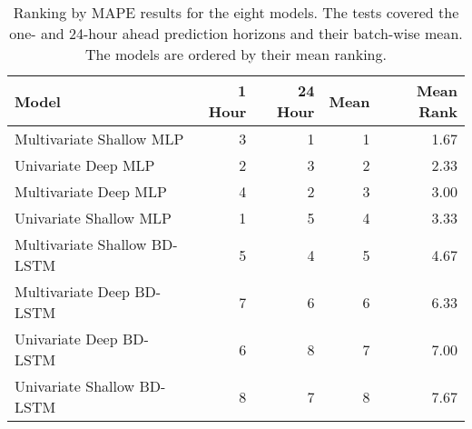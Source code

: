 \begin{table}[H]
\centering
\begin{tabular}{lrrr|r}
\toprule
Model & 1 Hour & 24 Hour & Mean & Mean Rank \\
\midrule
Multivariate Shallow MLP & 3 & 1 & 1 & 1.67 \\
Univariate Deep MLP & 2 & 3 & 2 & 2.33 \\
Multivariate Deep MLP & 4 & 2 & 3 & 3.00 \\
Univariate Shallow MLP & 1 & 5 & 4 & 3.33 \\
Multivariate Shallow BD-LSTM & 5 & 4 & 5 & 4.67 \\
Multivariate Deep BD-LSTM & 7 & 6 & 6 & 6.33 \\
Univariate Deep BD-LSTM & 6 & 8 & 7 & 7.00 \\
Univariate Shallow BD-LSTM & 8 & 7 & 8 & 7.67 \\
\bottomrule
\end{tabular}
\caption{Ranking by MAPE results for the eight models. The tests covered the one- and 24-hour ahead prediction horizons and their batch-wise mean. The models are ordered by their mean ranking.}
\label{mape-ranks}
\end{table}
